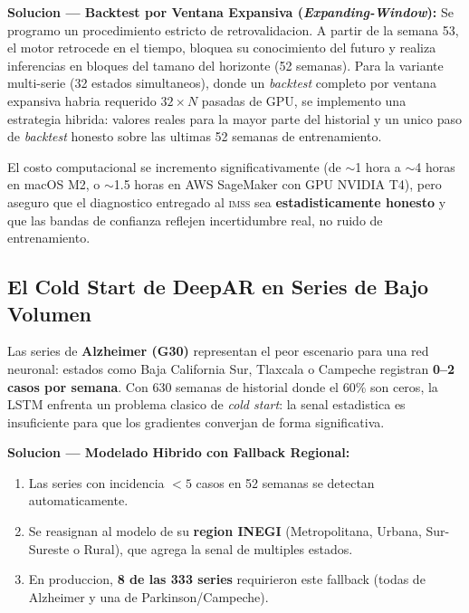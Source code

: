 \documentclass[12pt, letterpaper]{article}
\newcommand{\imss}{\textsc{imss}}
\begin{document}
\textbf{Solucion --- Backtest por Ventana Expansiva (\textit{Expanding-Window}):} Se programo un procedimiento estricto de retrovalidacion. A partir de la semana 53, el motor retrocede en el tiempo, bloquea su conocimiento del futuro y realiza inferencias en bloques del tamano del horizonte (52 semanas). Para la variante multi-serie (32 estados simultaneos), donde un \textit{backtest} completo por ventana expansiva habria requerido $32 \times N$ pasadas de GPU, se implemento una estrategia hibrida: valores reales para la mayor parte del historial y un unico paso de \textit{backtest} honesto sobre las ultimas 52 semanas de entrenamiento.

El costo computacional se incremento significativamente (de $\sim$1 hora a $\sim$4 horas en macOS M2, o $\sim$1.5 horas en AWS SageMaker con GPU NVIDIA T4), pero aseguro que el diagnostico entregado al \imss{} sea \textbf{estadisticamente honesto} y que las bandas de confianza reflejen incertidumbre real, no ruido de entrenamiento.

\subsection{El Cold Start de DeepAR en Series de Bajo Volumen}\label{subsec:coldstart}

\begin{warningbox}
Las series de \textbf{Alzheimer (G30)} representan el peor escenario para una red neuronal: estados como Baja California Sur, Tlaxcala o Campeche registran \textbf{0--2 casos por semana}. Con 630 semanas de historial donde el 60\% son ceros, la LSTM enfrenta un problema clasico de \textit{cold start}: la senal estadistica es insuficiente para que los gradientes converjan de forma significativa.
\end{warningbox}

\textbf{Solucion --- Modelado Hibrido con Fallback Regional:}
\begin{enumerate}[noitemsep]
    \item Las series con incidencia $<5$ casos en 52 semanas se detectan automaticamente.
    \item Se reasignan al modelo de su \textbf{region INEGI} (Metropolitana, Urbana, Sur-Sureste o Rural), que agrega la senal de multiples estados.
    \item En produccion, \textbf{8 de las 333 series} requirieron este fallback (todas de Alzheimer y una de Parkinson/Campeche).
\end{enumerate}
\end{document}
